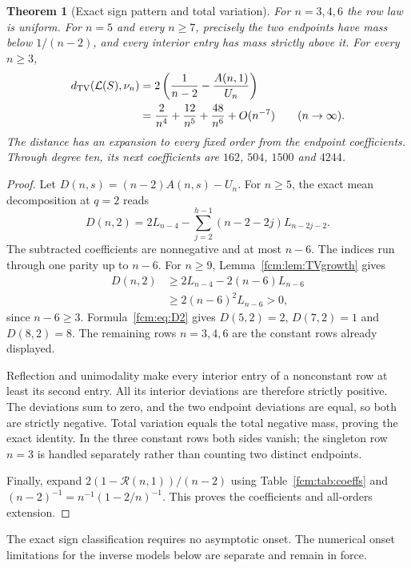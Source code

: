 \documentclass[11pt,letterpaper]{article}
\newtheorem{theorem}{Theorem}[section]
\theoremstyle{remark}\newtheorem{remark}[theorem]{Remark}
\newcommand{\TV}{d_{\mathrm{TV}}}
\newcommand{\RR}{\mathcal R}
\begin{document}
\begin{theorem}[Exact sign pattern and total variation]\label{fcm:thm:TV}
For $n=3,4,6$ the row law is uniform. For $n=5$ and every $n\ge7$, precisely the two endpoints have mass below $1/(n-2)$, and every interior entry has mass strictly above it. For every $n\ge3$,
\begin{align}\label{fcm:eq:TV}
 \TV(\mathcal L(S),\nu_n)
 &=2\left(\frac1{n-2}-\frac{A(n,1)}{U_n}\right)\notag\\
 &=\frac2{n^4}+\frac{12}{n^5}+\frac{48}{n^6}+O(n^{-7})\qquad(n\to\infty).
\end{align}
The distance has an expansion to every fixed order from the endpoint coefficients. Through degree ten, its next coefficients are $162$, $504$, $1500$ and $4244$.
\end{theorem}
\begin{proof}
Let $D(n,s)=(n-2)A(n,s)-U_n$. For $n\ge5$, the exact mean decomposition at $q=2$ reads
\begin{equation}\label{fcm:eq:D2}
 D(n,2)=2L_{n-4}-\sum_{j=2}^{h-1}(n-2-2j)L_{n-2j-2}.
\end{equation}
The subtracted coefficients are nonnegative and at most $n-6$. The indices run through one parity up to $n-6$. For $n\ge9$, Lemma~\ref{fcm:lem:TVgrowth} gives
\begin{align*}
 D(n,2)&\ge2L_{n-4}-2(n-6)L_{n-6}\\
 &\ge2(n-6)^2L_{n-6}>0,
\end{align*}
since $n-6\ge3$. Formula~\eqref{fcm:eq:D2} gives $D(5,2)=2$, $D(7,2)=1$ and $D(8,2)=8$. The remaining rows $n=3,4,6$ are the constant rows already displayed.

Reflection and unimodality make every interior entry of a nonconstant row at least its second entry. All its interior deviations are therefore strictly positive. The deviations sum to zero, and the two endpoint deviations are equal, so both are strictly negative. Total variation equals the total negative mass, proving the exact identity. In the three constant rows both sides vanish; the singleton row $n=3$ is handled separately rather than counting two distinct endpoints.

Finally, expand $2(1-\RR(n,1))/(n-2)$ using Table~\ref{fcm:tab:coeffs} and $(n-2)^{-1}=n^{-1}(1-2/n)^{-1}$. This proves the coefficients and all-orders extension.
\end{proof}
The exact sign classification requires no asymptotic onset. The numerical onset limitations for the inverse models below are separate and remain in force.
\end{document}
